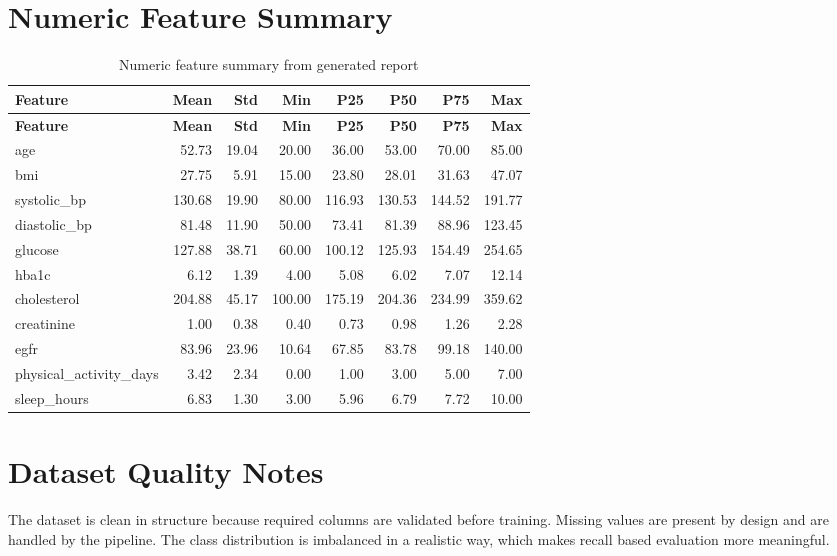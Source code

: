 \documentclass[12pt,a4paper,openany]{report}
\begin{document}
    \section{Numeric Feature Summary}
    \begin{longtable}{lrrrrrrr}
    \caption{Numeric feature summary from generated report} \\
    \toprule
    \textbf{Feature} & \textbf{Mean} & \textbf{Std} & \textbf{Min} & \textbf{P25} & \textbf{P50} & \textbf{P75} & \textbf{Max} \\
    \midrule
    \endfirsthead
    \toprule
    \textbf{Feature} & \textbf{Mean} & \textbf{Std} & \textbf{Min} & \textbf{P25} & \textbf{P50} & \textbf{P75} & \textbf{Max} \\
    \midrule
    \endhead
    age & 52.73 & 19.04 & 20.00 & 36.00 & 53.00 & 70.00 & 85.00 \\
    bmi & 27.75 & 5.91 & 15.00 & 23.80 & 28.01 & 31.63 & 47.07 \\
    systolic\_bp & 130.68 & 19.90 & 80.00 & 116.93 & 130.53 & 144.52 & 191.77 \\
    diastolic\_bp & 81.48 & 11.90 & 50.00 & 73.41 & 81.39 & 88.96 & 123.45 \\
    glucose & 127.88 & 38.71 & 60.00 & 100.12 & 125.93 & 154.49 & 254.65 \\
    hba1c & 6.12 & 1.39 & 4.00 & 5.08 & 6.02 & 7.07 & 12.14 \\
    cholesterol & 204.88 & 45.17 & 100.00 & 175.19 & 204.36 & 234.99 & 359.62 \\
    creatinine & 1.00 & 0.38 & 0.40 & 0.73 & 0.98 & 1.26 & 2.28 \\
    egfr & 83.96 & 23.96 & 10.64 & 67.85 & 83.78 & 99.18 & 140.00 \\
    physical\_activity\_days & 3.42 & 2.34 & 0.00 & 1.00 & 3.00 & 5.00 & 7.00 \\
    sleep\_hours & 6.83 & 1.30 & 3.00 & 5.96 & 6.79 & 7.72 & 10.00 \\
    \bottomrule
    \end{longtable}

    \section{Dataset Quality Notes}
    The dataset is clean in structure because required columns are validated before training. Missing values are present by design and are handled by the pipeline. The class distribution is imbalanced in a realistic way, which makes recall based evaluation more meaningful.
\end{document}
